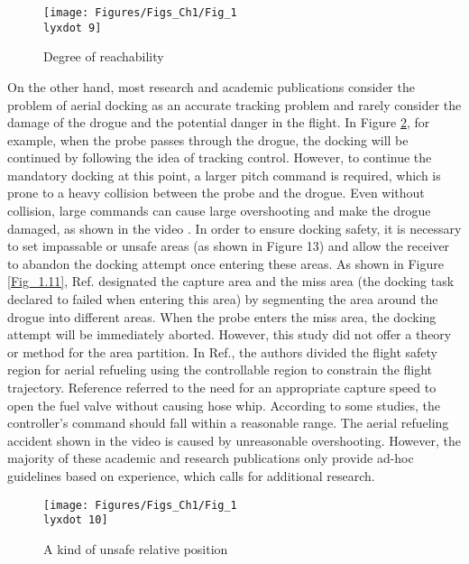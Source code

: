 \begin{figure}
\begin{centering}
\texttt{[image: Figures/Figs\_Ch1/Fig\_1\\lyxdot 9]}
\par\end{centering}
\caption{Degree of reachability}

\centering{}\label{Fig_1.9}
\end{figure}

On the other hand, most research and academic publications consider
the problem of aerial docking as an accurate tracking problem and
rarely consider the damage of the drogue and the potential danger
in the flight. In Figure \ref{Fig_1.10}, for example, when the probe
passes through the drogue, the docking will be continued by following
the idea of tracking control. However, to continue the mandatory docking
at this point, a larger pitch command is required, which is prone
to a heavy collision between the probe and the drogue. Even without
collision, large commands can cause large overshooting and make the
drogue damaged, as shown in the video \cite{Vedio1}. In order to
ensure docking safety, it is necessary to set impassable or unsafe
areas (as shown in Figure 13) and allow the receiver to abandon the
docking attempt once entering these areas. As shown in Figure \ref{Fig_1.11},
Ref. \cite{Dibley-2007-2} designated the \textquotedbl capture\textquotedbl{}
area and the \textquotedbl miss\textquotedbl{} area (the docking
task declared to failed when entering this area) by segmenting the
area around the drogue into different areas. When the probe enters
the \textquotedbl miss\textquotedbl{} area, the docking attempt will
be immediately aborted. However, this study did not offer a theory
or method for the area partition. In Ref.\cite{ding2012reachability},
the authors divided the flight safety region for aerial refueling
using the controllable region to constrain the flight trajectory.
Reference \cite{Ro-2010-5} referred to the need for an appropriate
capture speed to open the fuel valve without causing hose whip. According
to some studies, the controller's command should fall within a reasonable
range. The aerial refueling accident shown in the video \cite{Vedio2}
is caused by unreasonable overshooting. However, the majority of these
academic and research publications only provide ad-hoc guidelines
based on experience, which calls for additional research.

\begin{figure}
\begin{centering}
\texttt{[image: Figures/Figs\_Ch1/Fig\_1\\lyxdot 10]}
\par\end{centering}
\caption{A kind of unsafe relative position}

\centering{}\label{Fig_1.10}
\end{figure}

